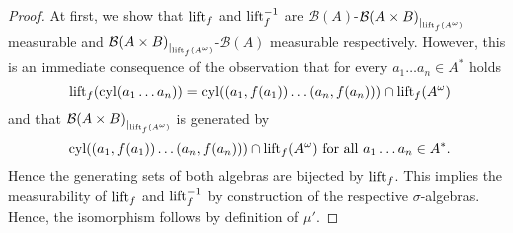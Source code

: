 \begin{proof}
  At first, we show that $\operatorname{lift}_{f}$ and $\operatorname{lift}_{f}^{-1}$ are 
  $\mathcal{B}(A)$-${\mathcal{B}(A\times B)}_{|_{\operatorname{lift}_{f}(A^{\omega})}}$
  measurable and
  ${\mathcal{B}(A\times B)}_{|_{\operatorname{lift}_{f}(A^{\omega})}}$-$\mathcal{B}(A)$
  measurable respectively. However, this is an immediate consequence of the
  observation that for every $a_{1}\dots a_{n}\in A^{*}$ holds
  \begin{equation*}
    \operatorname{lift}_{f}(\operatorname{cyl}(a_{1}\dots a_{n})) = 
      \operatorname{cyl}(\left(a_{1}, f(a_{1})\right)\dots\left(a_{n}, f(a_{n})\right))\cap
        \operatorname{lift}_{f}(A^{\omega})
  \end{equation*}
  and that ${\mathcal{B}(A\times B)}_{|_{\operatorname{lift}_{f}(A^{\omega})}}$ is
  generated by
  \begin{equation*}
    \operatorname{cyl}(\left(a_{1}, f(a_{1})\right)\dots\left(a_{n}, f(a_{n})\right))\cap
      \operatorname{lift}_{f}(A^{\omega})\text{ for all }a_{1}\dots a_{n}\in A^{*}.
  \end{equation*}
  Hence the generating sets of both algebras are bijected by $\operatorname{lift}_{f}$. This
  implies the measurability of $\operatorname{lift}_{f}$ and $\operatorname{lift}_{f}^{-1}$ by construction
  of the respective $\sigma$-algebras. Hence, the isomorphism follows by
  definition of $\mu'$.
\end{proof}
